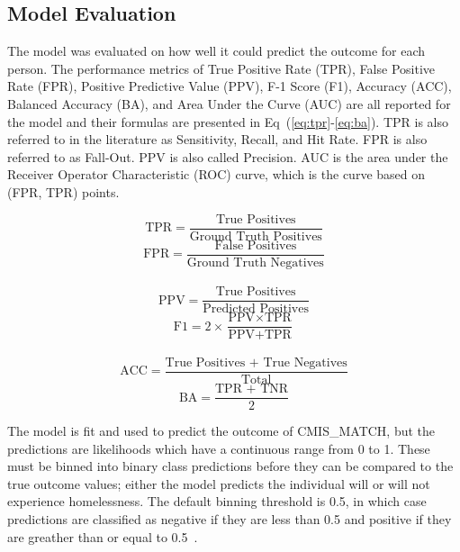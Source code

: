 \documentclass[10pt,letterpaper]{article}
\newcommand{\red}[1]{{\color{red}{#1}}}
\begin{document}
\subsection*{Model Evaluation}
The model was evaluated on how well it could predict the outcome for each person. The performance metrics of True Positive Rate (TPR), False Positive Rate (FPR), Positive Predictive Value (PPV), F-1 Score (F1), Accuracy (ACC), Balanced Accuracy (BA), and Area Under the Curve (AUC) are all reported for the model and their formulas are presented in Eq~(\ref{eq:tpr}-\ref{eq:ba}). TPR is also referred to in the literature as Sensitivity, Recall, and Hit Rate. FPR is also referred to as Fall-Out. PPV is also called Precision. AUC is the area under the Receiver Operator Characteristic (ROC) curve, which is the curve based on (FPR, TPR) points.

\begin{multicols}{2}
    \begin{equation}
        \text{TPR} = \frac{\text{True Positives}}{\text{Ground Truth Positives}}
        \label{eq:tpr}
    \end{equation}\break
    \begin{equation}
        \text{FPR} = \frac{\text{False Positives}}{\text{Ground Truth Negatives}}
        \label{eq:fpr}
    \end{equation}
    \\
    \begin{equation}
        \text{PPV} = \frac{\text{True Positives}}{\text{Predicted Positives}}
        \label{eq:ppv}
    \end{equation}\break
    \begin{equation}
        \text{F1} = 2\times\frac{\text{PPV}\times\text{TPR}}{\text{PPV} + \text{TPR}}
        \label{eq:f1}
    \end{equation}
    \\
    \begin{equation}
        \text{ACC} = \frac{\text{True Positives + True Negatives}}{\text{Total}}
        \label{eq:acc}
    \end{equation}\break
    \begin{equation}
        \text{BA} = \frac{\text{TPR + TNR}}{2}
        \label{eq:ba}
    \end{equation}
\end{multicols}
\red{remove all or some of these equations?}

The model is fit and used to predict the outcome of CMIS\_MATCH, but the predictions are likelihoods which have a continuous range from 0 to 1. These must be binned into binary class predictions before they can be compared to the true outcome values; either the model predicts the individual will or will not experience homelessness. The default binning threshold is 0.5, in which case predictions are classified as negative if they are less than 0.5 and positive if they are greather than or equal to 0.5~\cite{bewick2005statistics}. 
\end{document}
